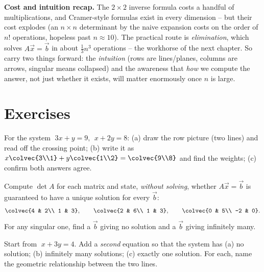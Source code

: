 \begin{marginnotebox}
\textbf{Cost and intuition recap.} The $2\times2$ inverse formula costs a
handful of multiplications, and Cramer-style formulas exist in every
dimension -- but their cost explodes (an $n\times n$ determinant by the naive
expansion costs on the order of $n!$ operations, hopeless past $n\approx 10$).
The practical route is \emph{elimination}, which solves $A\vec x=\vec b$ in
about $\tfrac13 n^3$ operations -- the workhorse of the next chapter. So carry
two things forward: the \emph{intuition} (rows are lines/planes, columns are
arrows, singular means collapsed) and the awareness that \emph{how} we
compute the answer, not just whether it exists, will matter enormously once
$n$ is large.
\end{marginnotebox}

\section{Exercises}

\begin{exercise}
\label{ch06:ex-both}
For the system $\;3x+y=9,\ \ x+2y=8$:
(a) draw the row picture (two lines) and read off the crossing point;
(b) write it as $x\colvec{3\\1}+y\colvec{1\\2}=\colvec{9\\8}$ and find the
weights; (c) confirm both answers agree.
\end{exercise}

\begin{exercise}
\label{ch06:ex-det}
Compute $\det A$ for each matrix and state, \emph{without solving}, whether
$A\vec x=\vec b$ is guaranteed to have a unique solution for every $\vec b$:
\[
  \colvec{4 & 2\\ 1 & 3},\qquad
  \colvec{2 & 6\\ 1 & 3},\qquad
  \colvec{0 & 5\\ -2 & 0}.
\]
For any singular one, find a $\vec b$ giving no solution and a $\vec b$
giving infinitely many.
\end{exercise}

\begin{exercise}
\label{ch06:ex-fail}
Start from $\;x+3y=4$. Add a \emph{second} equation so that the system has
(a) no solution; (b) infinitely many solutions; (c) exactly one solution.
For each, name the geometric relationship between the two lines.
\end{exercise}

